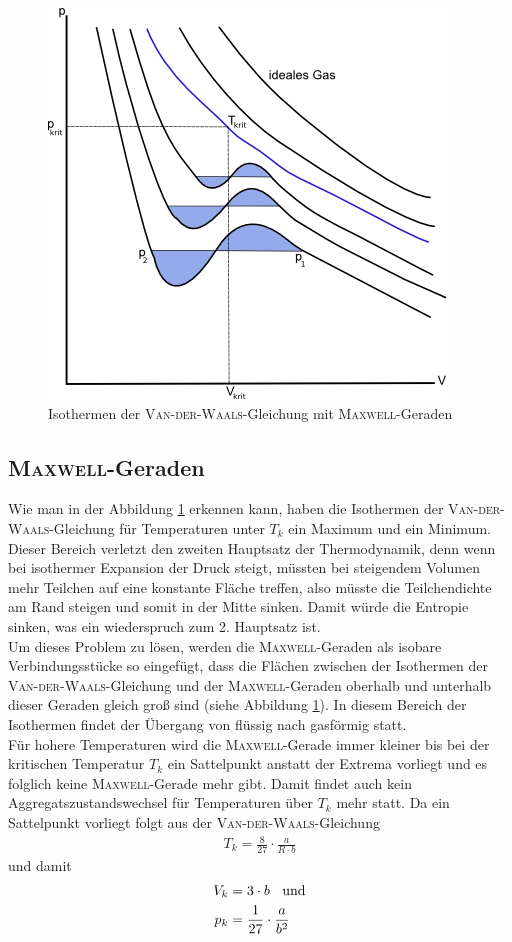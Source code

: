 \documentclass[12pt, a4paper, twoside]{scrartcl}
\newcommand{\person}[1]{\textsc{#1}}
\begin{document}
\begin{figure}
 \centering
 \includegraphics[scale=0.5]{maxwell.png}
 \caption{Isothermen der \person{Van-der-Waals}-Gleichung mit \person{Maxwell}-Geraden\protect\footnotemark\label{fig:maxwell}}
\end{figure}

\subsection{\person{Maxwell}-Geraden}
Wie man in der Abbildung \ref{fig:maxwell} erkennen kann, haben die Isothermen der \person{Van-der-Waals}-Gleichung für Temperaturen unter $T_k$ ein Maximum und ein Minimum.
Dieser Bereich verletzt den zweiten Hauptsatz der Thermodynamik, denn wenn bei isothermer Expansion der Druck steigt, müssten bei steigendem Volumen mehr Teilchen auf eine konstante Fläche treffen, also müsste die Teilchendichte am Rand steigen und somit in der Mitte sinken.
Damit würde die Entropie sinken, was ein wiederspruch zum 2. Hauptsatz ist.
\\
Um dieses Problem zu lösen, werden die \person{Maxwell}-Geraden als isobare Verbindungsstücke so eingefügt, dass die Flächen zwischen der Isothermen der \person{Van-der-Waals}-Gleichung und der \person{Maxwell}-Geraden oberhalb und unterhalb dieser Geraden gleich groß sind (siehe Abbildung \ref{fig:maxwell}).
In diesem Bereich der Isothermen findet der Übergang von flüssig nach gasförmig statt.
\\
Für hohere Temperaturen wird die \person{Maxwell}-Gerade immer kleiner bis bei der kritischen Temperatur $T_k$ ein Sattelpunkt anstatt der Extrema vorliegt und es folglich keine \person{Maxwell}-Gerade mehr gibt.
Damit findet auch kein Aggregatszustandswechsel für Temperaturen über $T_k$ mehr statt.
Da ein Sattelpunkt vorliegt folgt aus der \person{Van-der-Waals}-Gleichung
\begin{align}
 T_k = \frac{8}{27}\cdot \frac{a}{R\cdot b}
\end{align}
und damit
\begin{align}
 V_k &= 3\cdot b \textnormal{\;\; und}\\
 p_k &= \frac{1}{27}\cdot \frac{a}{b^2}
\end{align}
\end{document}
